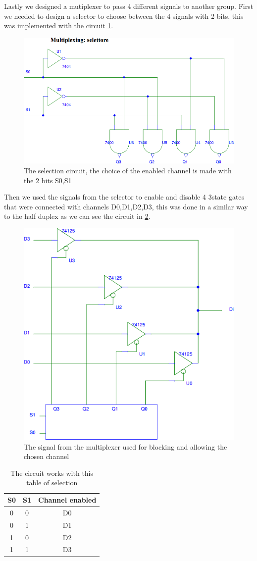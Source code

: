 Lastly we designed a mutiplexer to pass 4 different signals to another group. First we needed to design a selector to choose between the 4 signals with 2 bits, this was implemented with the circuit \ref{multi_select}.
\begin{figure}[H]
\centering
\includegraphics[width=.7\textwidth]{10/multi_select.png}
\caption{The selection circuit, the choice of the enabled channel is made with the 2 bits S0,S1}\label{multi_select}
\end{figure}
Then we used the signals from the selector to enable and disable 4 3state gates that were connected with channels D0,D1,D2,D3, this was done in a similar way to the half duplex as we can see the circuit in \ref{multi_wired}.
\begin{figure}[H]
\centering
\includegraphics[width=.7\textwidth]{10/multi_wired.png}
\caption{The signal from the multiplexer used for blocking and allowing the chosen channel}\label{multi_wired}
\end{figure}
\begin{table}[H]
\centering
\begin{tabular}{c|c|c}
 S0 & S1 & Channel enabled\\
 \hline
 0 & 0   & D0\\
 0 &1    &  D1\\
 1&0    & D2\\ 
 1 &1    &  D3\\ 
\end{tabular}\caption{The circuit works with this table of selection}

\end{table}

